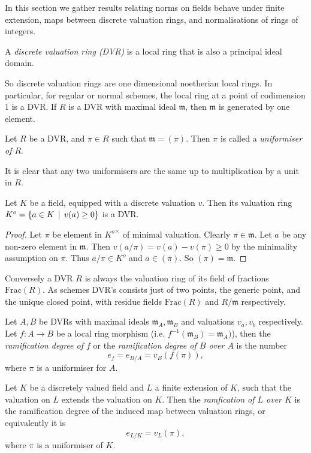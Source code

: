 In this section we gather results relating norms on fields behave under finite extension, maps between discrete valuation rings, and normalisations of rings of integers. 

\begin{definition}
	A \emph{discrete valuation ring (DVR)} is a local ring that is also a principal ideal domain. 
\end{definition}
So discrete valuation rings are one dimensional noetherian local rings. 
In particular, for regular or normal schemes, the local ring at a point of codimension $1$ is a DVR.
If $R$ is a DVR with maximal ideal $\mathfrak{m} $, then $\mathfrak{m} $ is generated by one element. 
\begin{definition}
	Let $R$ be a DVR, and $\pi \in R$ such that $\mathfrak{m}  = (\pi)$. 
	Then $\pi$ is called a \emph{uniformiser of $R$}. 
\end{definition}
It is clear that any two uniformisers are the same up to multiplication by a unit in $R$. 
\begin{lemma}
	Let $K$ be a field, equipped with a discrete valuation $v$. 
	Then its valuation ring $K^{o} = \{a \in K\st v(a) \ge 0\} $ is a DVR. 
\end{lemma}
\begin{proof}
	Let $\pi$ be element in ${K^{o}}^{\times }$ of minimal valuation. 
	Clearly $\pi \in \mathfrak{m} $. 
	Let $a$ be any non-zero element in $\mathfrak{m} $. 
	Then $v(a/ \pi) = v(a) - v(\pi) \ge 0$ by the minimality assumption on $\pi$. 
	Thus $a / \pi \in K^{o}$ and $a \in (\pi)$. 
	So $(\pi) = \mathfrak{m} $. 
\end{proof}

Conversely a DVR  $R$ is always the valuation ring of its field of fractions $\mathrm{Frac}(R)$. 
As schemes DVR's consists just of two points, the generic point, and the unique closed point, with residue fields $\mathrm{Frac}(R)$ and $R / \mathfrak{m} $ respectively. 

\begin{definition}
	Let $A, B$ be DVRs with maximal ideals $\mathfrak{m}_A, \mathfrak{m} _B$ and valuations $v_a, v_b$ respectively.
	Let $f: A \to B$ be a local ring morphism (i.e. $f^{-1}(\mathfrak{m} _B) = \mathfrak{m} _A)$), then the \emph{ramification degree of $f$} or the \emph{ramification degree of $B$ over $A$} is the number \[
		e_f = e_{B / A}= v_B(f(\pi))
	,\] 
	where $\pi$ is a uniformiser for $A$. 
\end{definition}

\begin{definition}
	Let $K$ be a discretely valued field and $L$ a finite extension of $K$, such that the valuation on $L$ extends the valuation on $K$. 
	Then the \emph{ramfication of  $L$ over  $K$} is the ramification degree of the induced map between valuation rings, or equivalently it is 
	\[
		e_{L / K}  = v_L(\pi)
	,\] 
	where $\pi$ is a uniformiser of $K$. 
\end{definition}

